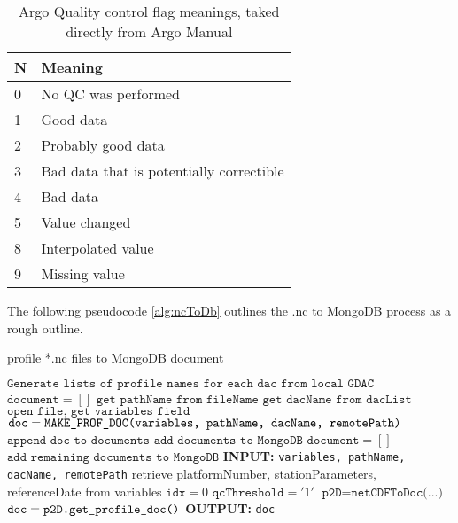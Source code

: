 \begin{table}[th]
\centering
\caption{Argo Quality control flag meanings, taked directly from Argo Manual \cite{argo_man}}
\label{tbl:qc}
{\begin{tabular}{ | p{3cm} | p{5cm} |} 
        \hline
        \textbf{N} & \textbf{Meaning} \tabularnewline \hline
        0 & No QC was performed \tabularnewline \hline
        1 & Good data \tabularnewline \hline
        2 & Probably good data \tabularnewline \hline
        3 & Bad data that is potentially correctible \tabularnewline \hline
        4 & Bad data \tabularnewline \hline
        5 & Value changed \tabularnewline \hline
        8 & Interpolated value \tabularnewline \hline
        9 & Missing value \tabularnewline \hline
        \end{tabular}}
\end{table}

The following pseudocode \ref{alg:ncToDb} outlines the .nc to MongoDB process as a rough outline.

\begin{algorithm}
\caption{profile *.nc files to MongoDB document}\label{alg:ncToDb}
\begin{algorithmic}[1]
\State $\texttt{Generate lists of profile names for each dac from local GDAC}$
\State $\texttt{document} = []$
\State $\texttt{get pathName from fileName}$
\State $\texttt{get dacName from dacList}$
\State $\texttt{open file, get variables field}$
\State $\texttt{doc} = \texttt{MAKE\textunderscore PROF\textunderscore DOC(variables, pathName, dacName, remotePath)}$
\State $\texttt{append doc to documents}$
\State $\texttt{add documents to MongoDB}$
\State $\texttt{document} = []$
\EndIf
\EndLoop
\State $\texttt{add remaining documents to MongoDB}$
\EndLoop
\EndProcedure
{}
\State \textbf{INPUT:} \texttt{variables, pathName, dacName, remotePath}
\State retrieve platformNumber, stationParameters, referenceDate from variables
\State $\texttt{idx}=0$
\State $\texttt{qcThreshold}='1'$
\State $\texttt{p2D} = \texttt{netCDFToDoc(...)}$
\State $\texttt{doc} = \texttt{p2D.get\textunderscore profile\textunderscore doc()}$
\State \textbf{OUTPUT:} \texttt{doc}
\EndProcedure
\end{algorithmic}
\end{algorithm}

